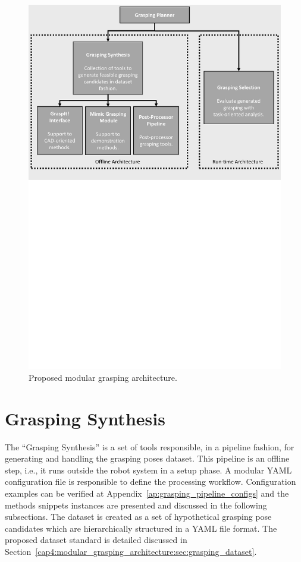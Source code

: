 \begin{figure}[h!]
\begin{tcolorbox}
\centerline{\includegraphics[trim={0cm 15cm 0cm 0cm},clip,width=0.95\linewidth,angle=0]{Cap4/Figuras/grasping_framework.pdf}}
\end{tcolorbox}
\caption{Proposed modular grasping architecture.}
\label{fig:grasping_framework_code}
\end{figure}

\section{Grasping Synthesis}
\label{cap4:modular_grasping_architecture:sec:grasping_synthesis}

The ``Grasping Synthesis'' is a set of tools responsible, in a pipeline fashion, for generating and handling the grasping poses dataset. This pipeline is an offline step, i.e., it runs outside the robot system in a setup phase. A modular YAML configuration file is responsible to define the processing workflow. Configuration examples can be verified at Appendix~\ref{ap:grasping_pipeline_configs} and the methods snippets instances are presented and discussed in the following subsections. The dataset is created as a set of hypothetical grasping pose candidates which are hierarchically structured in a YAML file format. The proposed dataset standard is detailed discussed in Section~\ref{cap4:modular_grasping_architecture:sec:grasping_dataset}.


